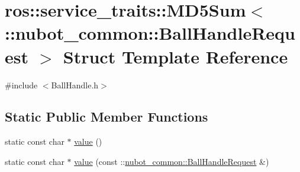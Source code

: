 \hypertarget{structros_1_1service__traits_1_1MD5Sum_3_01_1_1nubot__common_1_1BallHandleRequest_01_4}{\section{ros\-:\-:service\-\_\-traits\-:\-:M\-D5\-Sum$<$ \-:\-:nubot\-\_\-common\-:\-:Ball\-Handle\-Request $>$ Struct Template Reference}
\label{structros_1_1service__traits_1_1MD5Sum_3_01_1_1nubot__common_1_1BallHandleRequest_01_4}
}


{\ttfamily \#include $<$Ball\-Handle.\-h$>$}

\subsection*{Static Public Member Functions}
\begin{DoxyCompactItemize}
\item 
static const char $\ast$ \hyperlink{structros_1_1service__traits_1_1MD5Sum_3_01_1_1nubot__common_1_1BallHandleRequest_01_4_ad5b0871526ab7aaf3d4fc54f1d5ad61c}{value} ()
\item 
static const char $\ast$ \hyperlink{structros_1_1service__traits_1_1MD5Sum_3_01_1_1nubot__common_1_1BallHandleRequest_01_4_a8b397adfa8aaa8ea9c20b0b78f52797c}{value} (const \-::\hyperlink{namespacenubot__common_a47b9531f744aace81704d183c8f37107}{nubot\-\_\-common\-::\-Ball\-Handle\-Request} \&)
\end{DoxyCompactItemize}


